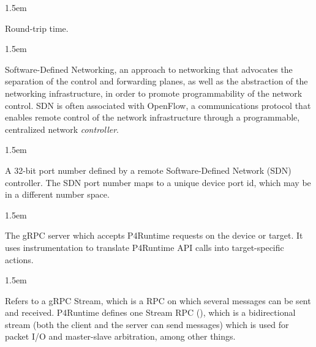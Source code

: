 \documentclass[11pt]{article}
\begin{document}
{\begin{mddefinitions}

\begin{mdbmarginx}{}{}{}{1.5em}%
\begin{mddefdata}%
Round-trip time.
\end{mddefdata}%
\end{mdbmarginx}%


\begin{mdbmarginx}{}{}{}{1.5em}%
\begin{mddefdata}%
Software-Defined Networking, an approach to networking that advocates the
separation of the control and forwarding planes, as well as the abstraction
of the networking infrastructure, in order to promote programmability of the
network control. SDN is often associated with OpenFlow, a communications
protocol that enables remote control of the network infrastructure through a
programmable, centralized network \emph{controller}.
\end{mddefdata}%
\end{mdbmarginx}%


\begin{mdbmarginx}{}{}{}{1.5em}%
\begin{mddefdata}%
A 32-bit port number defined by a remote Software-Defined Network (SDN)
controller. The SDN port number maps to a unique device port id, which may
be in a different number space.
\end{mddefdata}%
\end{mdbmarginx}%


\begin{mdbmarginx}{}{}{}{1.5em}%
\begin{mddefdata}%
The gRPC server which accepts P4Runtime requests on the device or target. It
uses instrumentation to translate P4Runtime API calls into target-specific
actions.
\end{mddefdata}%
\end{mdbmarginx}%


\begin{mdbmarginx}{}{}{}{1.5em}%
\begin{mddefdata}%
Refers to a gRPC Stream, which is a RPC on which several messages can be
sent and received. P4Runtime defines one Stream RPC (), which
is a bidirectional stream (both the client and the server can send messages)
which is used for packet I/O and master-slave arbitration, among other
things.
\end{mddefdata}%
\end{mdbmarginx}%


\end{mddefinitions}}
\end{document}
